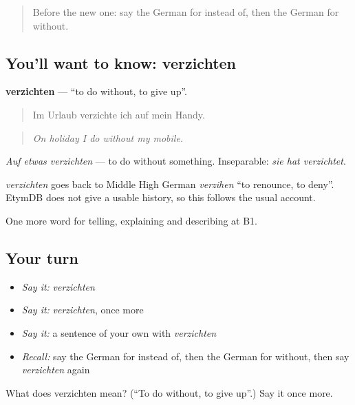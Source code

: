 \begin{quote}
Before the new one: say the German for instead of, then the German for without.
\end{quote}

\subsection*{You'll want to know: verzichten}
\textbf{verzichten} — \textquotedblleft{}to do without, to give up\textquotedblright{}.

\begin{quote}
Im Urlaub verzichte ich auf mein Handy.
\end{quote}

\begin{quote}
\emph{On holiday I do without my mobile.}
\end{quote}

\emph{Auf etwas verzichten} — to do without something. Inseparable: \emph{sie hat verzichtet}.

\begin{cousinweb}
\emph{verzichten} goes back to Middle High German \emph{verzihen} \textquotedblleft{}to renounce, to deny\textquotedblright{}. EtymDB does not give a usable history, so this follows the usual account.
\end{cousinweb}

\begin{grammarlens}[title={What you've built}]
One more word for telling, explaining and describing at B1.
\end{grammarlens}

\subsection*{Your turn}
\begin{itemize}
\raggedright
  \item \emph{Say it:} \emph{verzichten}
  \item \emph{Say it:} \emph{verzichten}, once more
  \item \emph{Say it:} a sentence of your own with \emph{verzichten}
  \item \emph{Recall:} say the German for instead of, then the German for without, then say \emph{verzichten} again
\end{itemize}

\begin{tcolorbox}[breakable,colback=teal!4,colframe=teal!35!black,title={Before you move on}]
What does verzichten mean? (\textquotedblleft{}To do without, to give up\textquotedblright{}.) Say it once more.
\end{tcolorbox}
